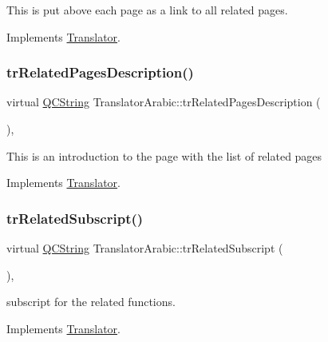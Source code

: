 This is put above each page as a link to all related pages. 

Implements \mbox{\hyperlink{class_translator}{Translator}}.

\mbox{\label{class_translator_arabic_a7f2f7f73b53eee9f0aa6564deb009fc9}} 
\subsubsection{\texorpdfstring{trRelatedPagesDescription()}{trRelatedPagesDescription()}}
{\footnotesize\ttfamily virtual \mbox{\hyperlink{class_q_c_string}{Q\+C\+String}} Translator\+Arabic\+::tr\+Related\+Pages\+Description (\begin{DoxyParamCaption}{ }\end{DoxyParamCaption})\hspace{0.3cm}{\ttfamily [inline]}, {\ttfamily [virtual]}}

This is an introduction to the page with the list of related pages 

Implements \mbox{\hyperlink{class_translator}{Translator}}.

\mbox{\label{class_translator_arabic_ab0afd6dda3c2213c7a5bbda491843482}} 
\subsubsection{\texorpdfstring{trRelatedSubscript()}{trRelatedSubscript()}}
{\footnotesize\ttfamily virtual \mbox{\hyperlink{class_q_c_string}{Q\+C\+String}} Translator\+Arabic\+::tr\+Related\+Subscript (\begin{DoxyParamCaption}{ }\end{DoxyParamCaption})\hspace{0.3cm}{\ttfamily [inline]}, {\ttfamily [virtual]}}

subscript for the related functions. 

Implements \mbox{\hyperlink{class_translator}{Translator}}.

\mbox{\label{class_translator_arabic_ab88dc42d6bc73e21be0b5cf4c1cc5ae7}} 
